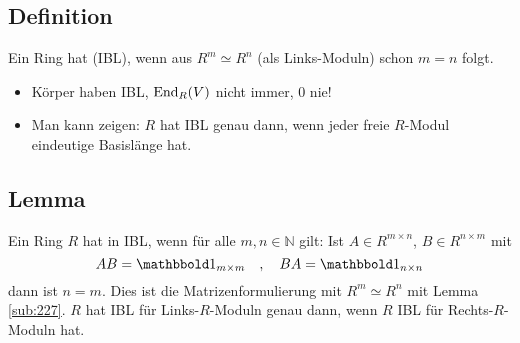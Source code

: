 \subsection[Definition: Invariante Basislänge (IBL)]{Definition} %
\label{sub:239}
Ein Ring hat  (IBL), wenn aus $R^m \simeq R^n$ (als Links-Moduln) schon $m=n$ folgt.
\begin{itemize}
	\item Körper haben IBL, $\operatorname{End}_R(V)$ nicht immer, $0$ nie!
	\item Man kann zeigen: $R$ hat IBL genau dann, wenn jeder freie $R$-Modul eindeutige Basislänge hat.
\end{itemize}

\subsection[Lemma: Charakterisierung von IBL in Matrizenformulierung]{Lemma} %
\label{sub:240}
Ein Ring $R$ hat in IBL, wenn für alle $m,n \in \mathds{N}$ gilt: Ist $A \in R^{m \times n}$, $B \in R^{n \times m}$ mit 
\[
	AB = \ind_{m \times m}\quad , 	\quad  BA= \ind_{n \times n} 
\]
dann ist $n=m$.
Dies ist die Matrizenformulierung mit $R^m \simeq R^n$ mit Lemma \ref{sub:227}. \bewende
{}
$R$ hat IBL für Links-$R$-Moduln genau dann, wenn $R$ IBL für Rechts-$R$-Moduln hat.

